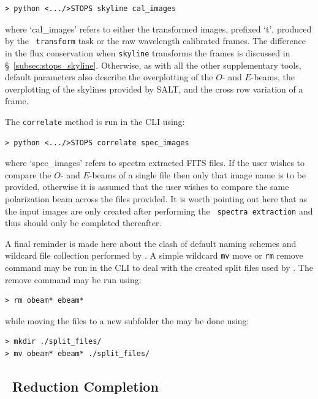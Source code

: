 \begin{verbatim}> python <.../>STOPS skyline cal_images\end{verbatim}

\noindent where `cal\_images' refers to either the transformed images, prefixed `t', produced by the \iraf\ \texttt{transform} task or the raw wavelength calibrated frames. The difference in the flux conservation when \texttt{skyline} transforms the frames is discussed in \S~\ref{subsec:stops_skyline}. Otherwise, as with all the other supplementary tools, default parameters also describe the overplotting of the $O$- and $E$-beams, the overplotting of the skylines provided by \gls{SALT}, and the cross row variation of a frame.

The \texttt{correlate} method is run in the \gls{CLI} using:

\begin{verbatim}> python <.../>STOPS correlate spec_images\end{verbatim}

\noindent where `spec\_images' refers to spectra extracted \gls{FITS} files. If the user wishes to compare the $O$- and $E$-beams of a single file then only that image name is to be provided, otherwise it is assumed that the user wishes to compare the same polarization beam across the files provided. It is worth pointing out here that as the input images are only created after performing the \polsalt\ \texttt{spectra extraction} and thus should only be completed thereafter.

A final reminder is made here about the clash of default naming schemes and wildcard file collection performed by \polsalt. A simple wildcard \texttt{mv} move or \texttt{rm} remove command may be run in the \gls{CLI} to deal with the created split files used by \iraf. The remove command may be run using:

\begin{verbatim}> rm obeam* ebeam*\end{verbatim}

\noindent while moving the files to a new subfolder the may be done using:

\begin{verbatim}> mkdir ./split_files/
> mv obeam* ebeam* ./split_files/
\end{verbatim}


\subsection{\polsalt\ Reduction Completion} \label{subsec:reduc_com}

